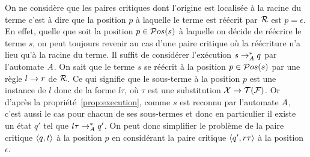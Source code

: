 On ne considère que les paires critiques dont l'origine est localisée à la racine du terme c'est à dire
que la position $p$ à laquelle le terme est réécrit par $\mathcal R$ est $p = \epsilon$.
En effet, quelle que soit la position $p \in \mathcal{ P}os(s)$ à laquelle on décide de réécrire le terme
$s$, on peut toujours revenir au cas d'une paire critique où la réécriture n'a lieu qu'à la racine du terme.
Il suffit de considérer l'exécution $s \rightarrow_\mathit A^* q$ par l'automate $\mathit A$. 
On sait que le terme $s$ se réécrit à la position $p \in \mathcal{ P}os(s)$ par une règle $l \rightarrow r$ de $\mathcal R$. Ce qui signifie que le sous-terme à la 
position $p$ est une instance de $l$ donc de la forme $l\tau$, où $\tau$ est une substitution $\mathcal X \rightarrow \mathcal{T(F)}$.
Or d'après la propriété~\ref{prop:execution}, comme $s$ est reconnu par l'automate $\mathit A$, c'est aussi le cas pour chacun de ses sous-termes
et donc en particulier il existe un état $q'$ tel que $l\tau \rightarrow_\mathit A^* q'$. On peut donc simplifier le problème de la paire critique $\langle q, t\rangle$ à la position $p$
en considérant la paire critique $\langle q', r\tau\rangle$ à la position $\epsilon$.


